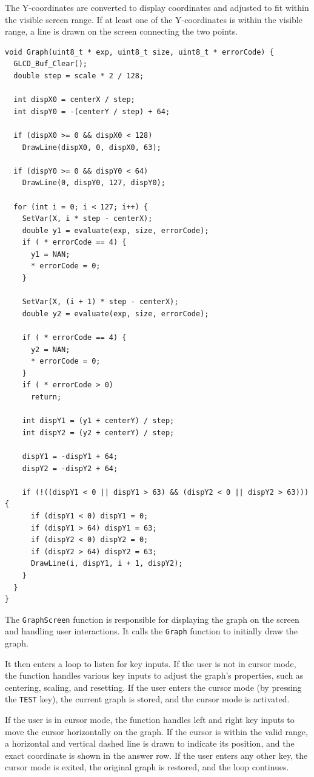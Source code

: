\documentclass[a4paper, twoside]{report}
\begin{document}
The Y-coordinates are converted to display coordinates and adjusted to fit within the visible screen range. If at least one of the Y-coordinates is within the visible range, a line is drawn on the screen connecting the two points.

\begin{verbatim}
void Graph(uint8_t * exp, uint8_t size, uint8_t * errorCode) {
  GLCD_Buf_Clear();
  double step = scale * 2 / 128;

  int dispX0 = centerX / step;
  int dispY0 = -(centerY / step) + 64;

  if (dispX0 >= 0 && dispX0 < 128)
    DrawLine(dispX0, 0, dispX0, 63);

  if (dispY0 >= 0 && dispY0 < 64)
    DrawLine(0, dispY0, 127, dispY0);

  for (int i = 0; i < 127; i++) {
    SetVar(X, i * step - centerX);
    double y1 = evaluate(exp, size, errorCode);
    if ( * errorCode == 4) {
      y1 = NAN;
      * errorCode = 0;
    }

    SetVar(X, (i + 1) * step - centerX);
    double y2 = evaluate(exp, size, errorCode);

    if ( * errorCode == 4) {
      y2 = NAN;
      * errorCode = 0;
    }
    if ( * errorCode > 0)
      return;

    int dispY1 = (y1 + centerY) / step;
    int dispY2 = (y2 + centerY) / step;

    dispY1 = -dispY1 + 64;
    dispY2 = -dispY2 + 64;

    if (!((dispY1 < 0 || dispY1 > 63) && (dispY2 < 0 || dispY2 > 63))) {
      if (dispY1 < 0) dispY1 = 0;
      if (dispY1 > 64) dispY1 = 63;
      if (dispY2 < 0) dispY2 = 0;
      if (dispY2 > 64) dispY2 = 63;
      DrawLine(i, dispY1, i + 1, dispY2);
    }
  }
}
\end{verbatim}

The \texttt{GraphScreen} function is responsible for displaying the graph on the screen and handling user interactions. It calls the \texttt{Graph} function to initially draw the graph.

It then enters a loop to listen for key inputs. If the user is not in cursor mode, the function handles various key inputs to adjust the graph's properties, such as centering, scaling, and resetting. If the user enters the cursor mode (by pressing the \texttt{TEST} key), the current graph is stored, and the cursor mode is activated.

If the user is in cursor mode, the function handles left and right key inputs to move the cursor horizontally on the graph. If the cursor is within the valid range, a horizontal and vertical dashed line is drawn to indicate its position, and the exact coordinate is shown in the answer row. If the user enters any other key, the cursor mode is exited, the original graph is restored, and the loop continues.
\end{document}
